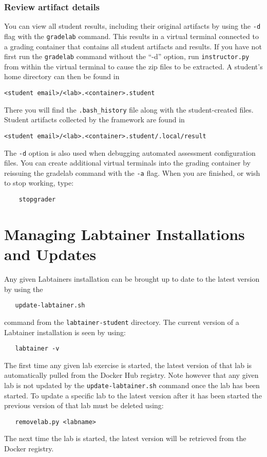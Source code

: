 \documentclass[12pt]{article}
\begin{document}
\subsubsection{Review artifact details}
You can view all student results, including their original artifacts by using the {\tt -d} flag
with the {\tt gradelab} command.  This results in a virtual terminal connected to a grading
container that contains all student artifacts and results.  If you have not first run the
{\tt gradelab} command without the ``-d'' option, run {\tt instructor.py} from within the
virtual terminal to cause the zip files to be extracted.  A student's home directory can
then be found in
\begin{verbatim}
<student email>/<lab>.<container>.student
\end{verbatim}
\noindent There you will find the {\tt .bash\_history} file along with the student-created files.
Student artifacts collected by the framework are found in 
\begin{verbatim}
<student email>/<lab>.<container>.student/.local/result
\end{verbatim}

\noindent The {\tt -d} option is also used when debugging automated assessment configuration
files.  You can create additional virtual terminals into the grading container by reissuing
the gradelab command with the {\tt -a} flag.  When you are finished, or wish to stop working, type:
\begin{verbatim}
    stopgrader
\end{verbatim}

\section{Managing Labtainer Installations and Updates}
Any given Labtainers installation can be brought up to date to the latest version by using the
\begin{verbatim}
   update-labtainer.sh
\end{verbatim}
\noindent command from the {\tt labtainer-student} directory.  The current version of a Labtainer installation is seen by using:
\begin{verbatim}
   labtainer -v
\end{verbatim}
\noindent
The first time any given lab exercise is started, the latest version of that lab is automatically pulled from
the Docker Hub registry.
Note however that any given lab is not updated by the {\tt update-labtainer.sh} command once the lab has been started.  
To update a specific lab to the latest version after it has been started the previous version of that lab must be deleted
using:
\begin{verbatim}
   removelab.py <labname>
\end{verbatim}
\noindent The next time the lab is started, the latest version will be retrieved from the Docker registry.
\end{document}
